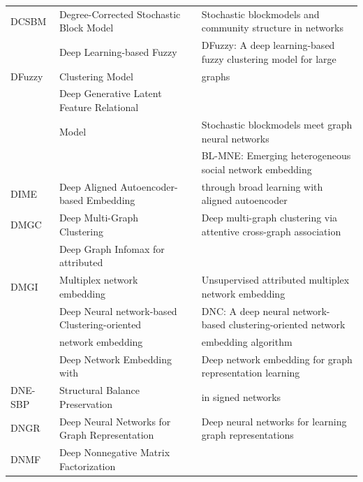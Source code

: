 \begin{table}[h]
\begin{tabular}{llll}
\rowcolor{gray!30}
DCSBM & Degree-Corrected Stochastic Block Model &  & Stochastic blockmodels and community structure in networks \\
& Deep Learning-based Fuzzy &  & DFuzzy: A deep learning-based fuzzy clustering model for large \\
\multirow{-2}{*}{DFuzzy} & Clustering Model & \multirow{-2}{*}{} & graphs \\
\rowcolor{gray!30}
& Deep Generative Latent Feature Relational &  &  \\ 
\rowcolor{gray!30}
\multirow{-2}{*}{DGLFRM} & Model & \multirow{-2}{*}{} & \multirow{-2}{*}{Stochastic blockmodels meet graph neural networks} \\ 
&  &  & BL-MNE: Emerging heterogeneous social network embedding \\
\multirow{-2}{*}{DIME} & \multirow{-2}{*}{Deep Aligned Autoencoder-based Embedding} & \multirow{-2}{*}{} & through broad learning with aligned autoencoder \\
\rowcolor{gray!30}
DMGC & Deep Multi-Graph Clustering &  & Deep multi-graph clustering via attentive cross-graph association \\
& Deep Graph Infomax for attributed &  &  \\ 
\multirow{-2}{*}{DMGI} & Multiplex network embedding & \multirow{-2}{*}{} & \multirow{-2}{*}{Unsupervised attributed multiplex network embedding} \\
\rowcolor{gray!30}
& Deep Neural network-based Clustering-oriented & & DNC: A deep neural network-based clustering-oriented network \\
\rowcolor{gray!30}
\multirow{-2}{*}{DNC} & network embedding & \multirow{-2}{*}{} & embedding algorithm \\
& Deep Network Embedding with &  & Deep network embedding for graph representation learning \\
\multirow{-2}{*}{DNE-SBP} & Structural Balance Preservation & \multirow{-2}{*}{} & in signed networks \\
\rowcolor{gray!30}
DNGR & Deep Neural Networks for Graph Representation &  & Deep neural networks for learning graph representations \\
DNMF & Deep Nonnegative Matrix Factorization & & \\
\bottomrule[1pt]
\end{tabular} \label{tab-abbr1}
\end{table}
